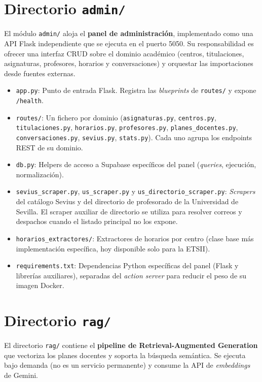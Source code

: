 \section{Directorio \texttt{admin/}}\label{sec:admin}

El módulo \texttt{admin/} aloja el \textbf{panel de administración}, implementado como una API Flask independiente que se ejecuta en el puerto 5050. Su responsabilidad es ofrecer una interfaz CRUD sobre el dominio académico (centros, titulaciones, asignaturas, profesores, horarios y conversaciones) y orquestar las importaciones desde fuentes externas.

\begin{itemize}
    \item \texttt{app.py}: Punto de entrada Flask. Registra las \textit{blueprints} de \texttt{routes/} y expone \texttt{/health}.
    \item \texttt{routes/}: Un fichero por dominio (\texttt{asignaturas.py}, \texttt{centros.py}, \texttt{titulaciones.py}, \texttt{horarios.py}, \texttt{profesores.py}, \texttt{planes\_docentes.py}, \texttt{conversaciones.py}, \texttt{sevius.py}, \texttt{stats.py}). Cada uno agrupa los endpoints REST de su dominio.
    \item \texttt{db.py}: Helpers de acceso a Supabase específicos del panel (\textit{queries}, ejecución, normalización).
    \item \texttt{sevius\_scraper.py}, \texttt{us\_scraper.py} y \texttt{us\_directorio\_scraper.py}: \textit{Scrapers} del catálogo Sevius y del directorio de profesorado de la Universidad de Sevilla. El scraper auxiliar de directorio se utiliza para resolver correos y despachos cuando el listado principal no los expone.
    \item \texttt{horarios\_extractores/}: Extractores de horarios por centro (clase base más implementación específica, hoy disponible solo para la ETSII).
    \item \texttt{requirements.txt}: Dependencias Python específicas del panel (Flask y librerías auxiliares), separadas del \textit{action server} para reducir el peso de su imagen Docker.
\end{itemize}

\section{Directorio \texttt{rag/}}\label{sec:rag-dir}

El directorio \texttt{rag/} contiene el \textbf{pipeline de Retrieval-Augmented Generation} que vectoriza los planes docentes y soporta la búsqueda semántica. Se ejecuta bajo demanda (no es un servicio permanente) y consume la API de \textit{embeddings} de Gemini.

